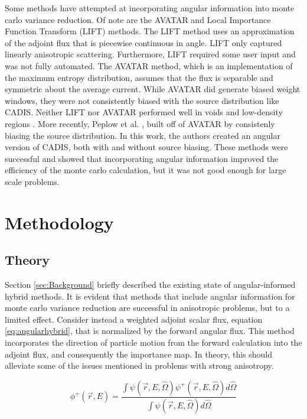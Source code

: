 \documentclass{mc2015}
\begin{document}
Some methods have attempted at incorporating angular information into monte carlo variance reduction. Of note are the AVATAR \cite{van_riper_avatarautomatic_1997} and Local Importance Function Transform (LIFT) \cite{turner_automatic_1997} methods. The LIFT method uses an approximation of the adjoint flux that is piecewise continuous in angle. LIFT only captured linearly anisotropic scattering. Furthermore, LIFT required some user input and was not fully automated. The AVATAR method, which is an implementation of the maximum entropy distribution, assumes that the flux is separable and symmetric about the average current. While AVATAR did generate biased weight windows, they were not consistently biased with the source distribution like CADIS. Neither LIFT nor AVATAR performed well in voids and low-density regions \cite{turner_automatic_1997-1}. More recently, Peplow et al. \cite{Peplow-ORNL}, built off of AVATAR by consistenly biasing the source distribution. In this work, the authors created an angular version of CADIS, both with and without source biasing. These methods were successful and showed that incorporating angular information improved the efficiency of the monte carlo calculation, but it was not good enough for large scale problems. 

\section{Methodology}
\label{sec:Methodology}

\subsection{Theory}
\label{sec:Theory}

Section \ref{sec:Background} briefly described the existing state of angular-informed hybrid methods. It is evident that methods that include angular information for monte carlo variance reduction are successful in anisotropic problems, but to a limited effect. 
Consider instead a weighted adjoint scalar flux, equation \ref{eq:angularhybrid}, that is normalized by the forward angular flux. This method incorporates the direction of particle motion from the forward calculation into the adjoint flux, and consequently the importance map. In theory, this should alleviate some of the issues mentioned in problems with strong anisotropy. 

\begin{equation} 
\label{eq:angularhybrid}
\phi^{+}(\vec{r},E) = \frac{\int \psi(\vec {r} ,E,\hat{\Omega})\psi^+(\vec {r} ,E,\hat{\Omega})d\hat\Omega }{\int\psi(\vec {r} ,E,\hat{\Omega})d\hat\Omega}
\end{equation}
\end{document}
